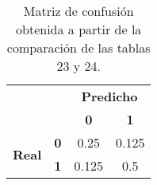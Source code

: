 \begin{table}[]
	\centering
	\begin{tabular}{ll|c|c|}
		\cline{3-4}
		&  & \multicolumn{2}{c|}{\textbf{Predicho}} \\ \cline{3-4}
		&  & \textbf{0}         & \textbf{1}        \\ \hline
		\multicolumn{1}{|c|}{\multirow{2}{*}{\textbf{Real}}} & \multicolumn{1}{c|}{\textbf{0}} & 0.25  & 0.125 \\ \cline{2-4}
		\multicolumn{1}{|c|}{}                               & \multicolumn{1}{c|}{\textbf{1}} & 0.125 & 0.5   \\ \hline
	\end{tabular}
	\caption{Matriz de confusión obtenida a partir de la comparación de las tablas 23 y 24.}
	\label{tab:validacion-confusion-ejemplo}
\end{table}